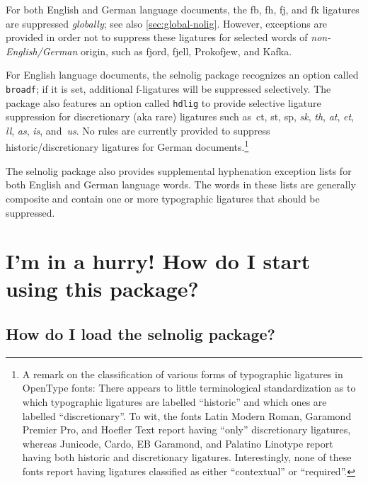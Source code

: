 \documentclass[11pt]{article}
\newcommand{\pkg}[1]{\textsf{#1}}
\newcommand{\opt}[1]{\texttt{#1}}
\newcommand{\uselig}[1]{\selnoligoff\mbox{#1}\selnoligon}
\begin{document}
For both English and German language documents, the {\ebg \uselig{fb}, \uselig{fh}, \uselig{fj}, and \uselig{fk}} ligatures are suppressed \emph{globally}; see also \cref{sec:global-nolig}. However, exceptions are provided in order not to suppress these ligatures for selected words of \emph{non-English\slash German} origin, such as {\ebg fjord, fjell, Prokofjew, and Kafka}.

For English language documents, the \pkg{selnolig} package recognizes an option called \opt{broadf}; if it is set, additional f-ligatures will be suppressed selectively. The package also features an option called \opt{hdlig} to provide selective ligature suppression for discretionary (aka rare) ligatures such as~ct, st, sp, {\ebg\emph{sk}}, \emph{th}, \emph{at}, \emph{et}, \emph{ll}, \emph{as}, \emph{is}, and~\emph{us}. No rules are currently provided to suppress historic\slash discretionary ligatures for German documents.\footnote{A remark on the classification of various forms of typographic ligatures in OpenType fonts: There appears to little terminological standardization as to which typographic ligatures are labelled \enquote{historic} and which ones are labelled \enquote{discretionary}. To wit, the fonts Latin Modern Roman, Garamond Premier Pro, and Hoefler Text report having \enquote{only} discretionary ligatures, whereas Junicode, Cardo, EB Garamond, and Palatino Linotype report having both historic and discretionary ligatures. Interestingly, none of these fonts report having ligatures classified as either \enquote{contextual} or \enquote{required}. }

The \pkg{selnolig} package also provides supplemental hyphenation exception lists for both English and German language words. The words in these lists are generally composite and contain one or more typographic ligatures that should be suppressed.



\section{I'm in a hurry! How do I start using this package?}

\subsection[How do I load the selnolig package?]{How do I load the \pkg{selnolig} package?}

\end{document}
